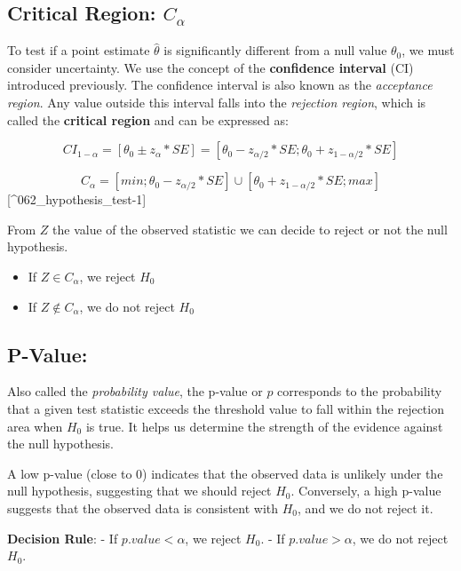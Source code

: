 \documentclass[
  letterpaper,
  DIV=11,
  numbers=noendperiod]{scrreprt}
\providecommand{\tightlist}{%
  \setlength{\itemsep}{0pt}\setlength{\parskip}{0pt}}\usepackage{longtable,booktabs,array}
\begin{document}
\subsection{\texorpdfstring{Critical Region:
\(C_\alpha\)}{Critical Region: C\_\textbackslash alpha}}\label{critical-region-c_alpha}

To test if a point estimate \(\hat{\theta}\) is significantly different
from a null value \(\theta_0\), we must consider uncertainty. We use the
concept of the \textbf{confidence interval} (CI) introduced previously.
The confidence interval is also known as the \emph{acceptance region}.
Any value outside this interval falls into the \emph{rejection region},
which is called the \textbf{critical region} and can be expressed as:

\[CI_{1-\alpha} = [\theta_0 \pm z_\alpha * SE ] = [ \theta_0 - z_{\alpha/2} * SE ; \theta_0 + z_{1-\alpha/2} * SE ] \]

\[C_\alpha = [ min ; \theta_0 - z_{\alpha/2} * SE] \cup [ \theta_0 + z_{1-\alpha/2} * SE ; max ]\]{[}\^{}062\_hypothesis\_test-1{]}

From \(Z\) the value of the observed statistic we can decide to reject
or not the null hypothesis.

\begin{itemize}
\tightlist
\item
  If \(Z \in C_\alpha\), we reject \(H_0\)
\item
  If \(Z \notin C_\alpha\), we do not reject \(H_0\)
\end{itemize}

\subsection{P-Value:}\label{p-value}

Also called the \emph{probability value}, the p-value or \(p\)
corresponds to the probability that a given test statistic exceeds the
threshold value to fall within the rejection area when \(H_0\) is true.
It helps us determine the strength of the evidence against the null
hypothesis.

A low p-value (close to 0) indicates that the observed data is unlikely
under the null hypothesis, suggesting that we should reject \(H_0\).
Conversely, a high p-value suggests that the observed data is consistent
with \(H_0\), and we do not reject it.

\textbf{Decision Rule}: - If \(p.value < \alpha\), we reject \(H_0\). -
If \(p.value > \alpha\), we do not reject \(H_0\).
\end{document}
